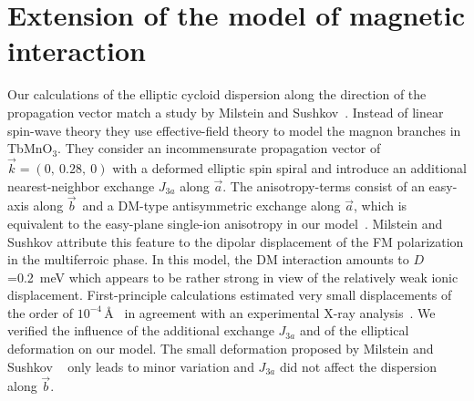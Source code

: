 \documentclass[aps,prb,twocolumn,superscriptaddress,showpacs,floatfix]{revtex4-2}
\newcommand{\tbmno}{TbMnO$_3$}
\newcommand{\aaxis}{$\vec{a}$}
\newcommand{\baxis}{$\vec{b}$}
\begin{document}
\section{Extension of the model of magnetic interaction}


Our calculations of the elliptic cycloid dispersion along the direction of the propagation vector match a study by Milstein and Sushkov~\cite{Milstein2015}. Instead of linear spin-wave theory they use effective-field theory to model the magnon branches in \tbmno.
They consider an incommensurate propagation vector of $\vec{k}=(0,~0.28,~0)$ with a deformed elliptic spin spiral and introduce an additional
nearest-neighbor exchange $J_{3a}$ along \aaxis.
The anisotropy-terms consist of an easy-axis along \baxis\ and a DM-type antisymmetric exchange along \aaxis,
which is equivalent to the easy-plane single-ion anisotropy in our model~\cite{Milstein2015}.
Milstein and Sushkov attribute this feature to the dipolar displacement of the FM polarization in the multiferroic phase.
In this model, the DM interaction amounts to $D$=\SI{0.2}{\meV} which appears to be rather strong in view of the relatively weak ionic displacement.
First-principle calculations estimated very small displacements of the order of $10^{-4}$\,\AA~\cite{Xiang2008,Malashevich2008a} in agreement with an experimental X-ray analysis~\cite{Walker2011}. We verified the influence of the additional exchange $J_{3a}$ and of the elliptical deformation on our model. The small deformation proposed by Milstein and Sushkov ~\cite{Milstein2015} only leads to minor variation and $J_{3a}$ did not affect the dispersion along \baxis.
\end{document}
